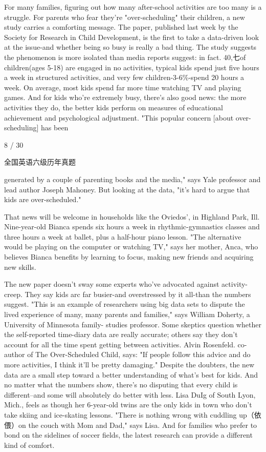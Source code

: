 \documentclass[UTF8,11pt]{ctexart}
\begin{document}
For many families, figuring out how many after-school activities are too many is a struggle. For parents who fear they're "over-scheduling" their children, a new study carries a comforting message. The paper, published last week by the Society for Research in Child Development, is the first to take a data-driven look at the issue-and whether being so busy is really a bad thing. The study suggests the phenomenon is more isolated than media reports suggest: in fact. 40,七of children(ages 5-18) are engaged in no activities, typical kids spend just five hours a week in structured activities, and very few children-3-6\%-spend 20 hours a week. On average, most kids spend far more time watching TV and playing games. And for kids who're extremely busy, there's also good news: the more activities they do, the better kids perform on measures of educational achievement and psychological adjustment. "This popular concern [about over-scheduling] has been


8 / 30


全国英语六级历年真题


generated by a couple of parenting books and the media," says Yale professor and lead author Joseph Mahoney. But looking at the data, "it's hard to argue that kids are over-scheduled."


That news will be welcome in households like the Oviedos', in Highland Park, Ill. Nine-year-old Bianca spends six hours a week in rhythmic-gymnastics classes and three hours a week at ballet, plus a half-hour piano lesson. "The alternative would be playing on the computer or watching TV," says her mother, Anca, who believes Bianca benefits by learning to focus, making new friends and acquiring new skills.


The new paper doesn't sway some experts who've advocated against activity-creep. They say kids arc far busier-and overstressed by it all-than the numbers suggest. "This is an example of researchers using big data sets to dispute the lived experience of many, many parents and families," says William Doherty, a University of Minnesota family- studies professor. Some skeptics question whether the self-reported time-diary data are really accurate; others say they don't account for all the time spent getting between activities. Alvin Rosenfeld. co-author of The Over-Scheduled Child, says: "If people follow this advice and do more activities, I think it'll be pretty damaging." Despite the doubters, the new data are a small step toward a better understanding of what's best for kids. And no matter what the numbers show, there's no disputing that every child is different--and some will absolutely do better with less. Lisa DuIg of South Lyon, Mich., feels as though her 6-year-old twins are the only kids in town who don't take skiing and ice-skating lessons. "There is nothing wrong with cuddling up（依偎）on the couch with Mom and Dad," says Lisa. And for families who prefer to bond on the sidelines of soccer fields, the latest research can provide a different kind of comfort.
\end{document}
